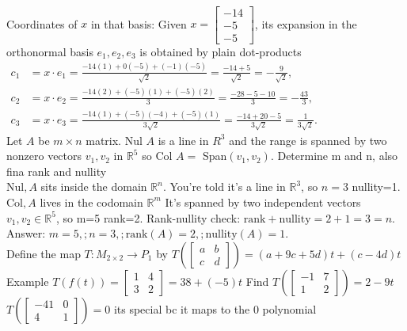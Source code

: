 \documentclass{article}
\begin{document}
\begin{multicols*}{2}
\\Coordinates of $x$ in that basis: Given $x=\begin{bmatrix}-14\\-5\\-5\end{bmatrix}$, its expansion in the orthonormal basis ${e_1,e_2,e_3}$ is obtained by plain dot-products
\\$\begin{aligned}c_1 &= x\cdot e_1=\frac{-14(1)+0(-5)+(-1)(-5)}{\sqrt{2}}=\frac{-14+5}{\sqrt{2}}=-\frac{9}{\sqrt{2}},\\[6pt]c_2 &= x\cdot e_2=\frac{-14(2)+(-5)(1)+(-5)(2)}{3}=\frac{-28-5-10}{3}=-\frac{43}{3},\\[6pt]c_3 &= x\cdot e_3=\frac{-14(1)+(-5)(-4)+(-5)(1)}{3\sqrt{2}}=\frac{-14+20-5}{3\sqrt{2}}=\frac{1}{3\sqrt{2}}.\end{aligned}$
\\Let $A$ be $m\times n$ matrix. Nul $A$ is a  line in $R^3$ and the range is spanned by two nonzero vectors $v_1,v_2$ in $\mathbb{R}^5$ so Col $A=$ Span$ (v_1,v_2)$. Determine m and n, also fina rank and nullity
\\$\text{Nul},A$ sits inside the domain $\mathbb{R}^n$. You’re told it’s a line in $\mathbb{R}^3$, so $n=3$ nullity=1. $\text{Col},A$ lives in the codomain $\mathbb{R}^m$ It’s spanned by two independent vectors $v_1,v_2\in\mathbb{R}^5$, so m=5 rank=2. Rank-nullity check: $\text{rank}+\text{nullity}=2+1=3=n$. Answer: $m=5,; n=3,; \text{rank}(A)=2,; \text{nullity}(A)=1.$
\\Define the map $T : M_{2 \times 2} \to P_1$ by $T\left( \begin{bmatrix} a & b \\ c & d \end{bmatrix} \right) = (a + 9c + 5d) t + (c - 4d) t$
\\Example $T(f(t)) = \begin{bmatrix} 1 & 4 \\ 3 & 2 \end{bmatrix} = 38 + (-5)t$ Find $T\left( \begin{bmatrix} -1 & 7 \\ 1 & 2 \end{bmatrix} \right) = 2-9t$
\\$T\left( \begin{bmatrix} -41 & 0 \\ 4 & 1 \end{bmatrix} \right) = 0$ its special bc it maps to the 0 polynomial

\end{multicols*}
\end{document}
